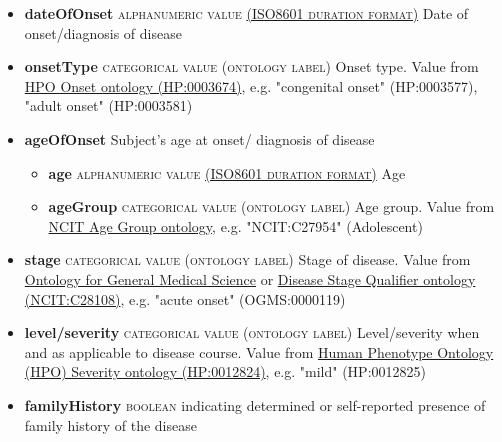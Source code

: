 \documentclass[a4paper, 10pt]{article}        %
\begin{document}
\begin{description}
\begin{itemize}
			\item[] \textbf{dateOfOnset} {\textsc{alphanumeric value \href{https://www.iso.org/iso-8601-date-and-time-format.html}{(ISO8601 duration format)}}} Date of onset/diagnosis of disease
			\item[] \textbf{onsetType} {\textsc{categorical value (ontology label)}}
 Onset type. Value from \href{http://purl.obolibrary.org/obo/HP_0003674}{HPO Onset ontology (HP:0003674)}, e.g. "congenital onset" (HP:0003577), "adult onset" (HP:0003581)
			\item[]  \textbf{ageOfOnset} Subject's age at onset/ diagnosis of disease
			\begin{itemize}
			\item[] \textbf{age} {\textsc{alphanumeric value \href{https://www.iso.org/iso-8601-date-and-time-format.html}{(ISO8601 duration format)}}} Age  
			\item[] \textbf{ageGroup} {\textsc{categorical value (ontology label)}} Age group. Value from \href{https://www.ebi.ac.uk/ols/ontologies/ncit/terms?iri=http%3A%2F%2Fpurl.obolibrary.org%2Fobo%2FNCIT_C20587}{NCIT Age Group ontology}, e.g. "NCIT:C27954" (Adolescent)
			\end{itemize}
			\item[]  \textbf{stage} {\textsc{categorical value (ontology label)}} Stage of disease. Value from \href{https://www.ebi.ac.uk/ols/ontologies/ogms}{Ontology for General Medical Science} or \href{https://www.ebi.ac.uk/ols/ontologies/ncit/terms?iri=http%3A%2F%2Fpurl.obolibrary.org%2Fobo%2FNCIT_C28108}{Disease Stage Qualifier ontology (NCIT:C28108)}, e.g. "acute onset" (OGMS:0000119)
			\item[] \textbf{level/severity} {\textsc{categorical value (ontology label)}} Level/severity when and as applicable to disease course. Value from \href{http://purl.obolibrary.org/obo/HP_0012824}{Human Phenotype Ontology (HPO) Severity ontology (HP:0012824)}, e.g. "mild" (HP:0012825)
			\item[] \textbf{familyHistory} {\textsc{boolean}} indicating determined or self-reported presence of family history of the disease
	\end{itemize}


\end{description}
\end{document}
